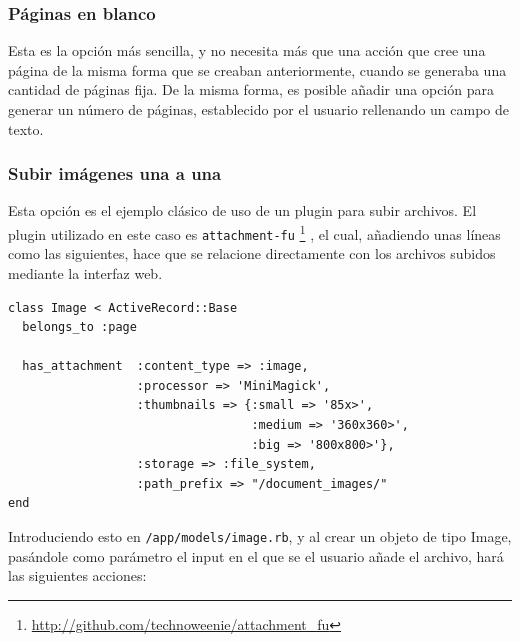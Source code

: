 \subsubsection{Páginas en blanco} %
\label{ssub:paginas_en_blanco}

Esta es la opción más sencilla, y no necesita más que una acción que cree una página de la misma forma que se creaban anteriormente, cuando se generaba una cantidad de páginas fija. De la misma forma, es posible añadir una opción para generar un número de páginas, establecido por el usuario rellenando un campo de texto.


\subsubsection{Subir imágenes una a una} %
\label{ssub:subir_imagenes_una_a_una}

Esta opción es el ejemplo clásico de uso de un plugin para subir archivos. El plugin utilizado en este caso es \texttt{attachment-fu} \footnote{\url{http://github.com/technoweenie/attachment\_fu}} , el cual, añadiendo unas líneas como las siguientes, hace que se relacione directamente con los archivos subidos mediante la interfaz web.

\begin{verbatim}
class Image < ActiveRecord::Base
  belongs_to :page
  
  has_attachment  :content_type => :image,
                  :processor => 'MiniMagick',
                  :thumbnails => {:small => '85x>',
                                  :medium => '360x360>',
                                  :big => '800x800>'},
                  :storage => :file_system,
                  :path_prefix => "/document_images/"
end
\end{verbatim}

Introduciendo esto en \texttt{/app/models/image.rb}, y al crear un objeto de tipo Image, pasándole como parámetro el input en el que se el usuario añade el archivo, hará las siguientes acciones:


